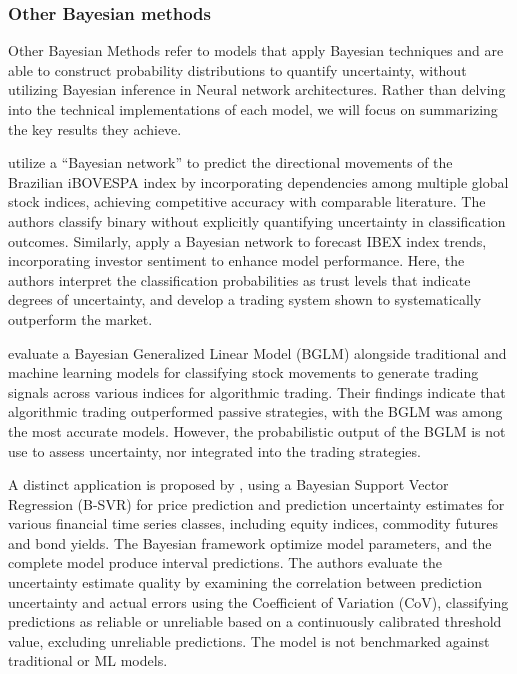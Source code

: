 \subsubsection{Other Bayesian methods}
Other Bayesian Methods refer to models that apply Bayesian techniques and are able to construct probability distributions to quantify uncertainty, without utilizing Bayesian inference in Neural network architectures. Rather than delving into the technical implementations of each model, we will focus on summarizing the key results they achieve. 

\textcite{Malagrino2018Forecasting} utilize a ``Bayesian network'' to predict the directional movements of the Brazilian iBOVESPA index by incorporating dependencies among multiple global stock indices, achieving competitive accuracy with comparable literature. The authors classify binary without explicitly quantifying uncertainty in classification outcomes. Similarly, \textcite{Raúl_PlazaCasado_PradoRomán_2021} apply a Bayesian network to forecast IBEX index trends, incorporating investor sentiment to enhance model performance. Here, the authors interpret the classification probabilities as trust levels that indicate degrees of uncertainty, and develop a trading system shown to systematically outperform the market.

\textcite{Grudniewicz2023Application} evaluate a Bayesian Generalized Linear Model (BGLM) alongside traditional and machine learning models for classifying stock movements to generate trading signals across various indices for algorithmic trading. Their findings indicate that algorithmic trading outperformed passive strategies, with the BGLM was among the most accurate models. However, the probabilistic output of the BGLM is not use to assess uncertainty, nor integrated into the trading strategies. 

A distinct application is proposed by \textcite{Law2017Practical}, using a Bayesian Support Vector Regression (B-SVR) for price prediction and prediction uncertainty estimates for various financial time series classes, including equity indices, commodity futures and bond yields. The Bayesian framework optimize model parameters, and the complete model produce interval predictions. The authors evaluate the uncertainty estimate quality by examining the correlation between prediction uncertainty and actual errors using the Coefficient of Variation (CoV), classifying predictions as reliable or unreliable based on a continuously calibrated threshold value, excluding unreliable predictions. The model is not benchmarked against traditional or ML models. 

